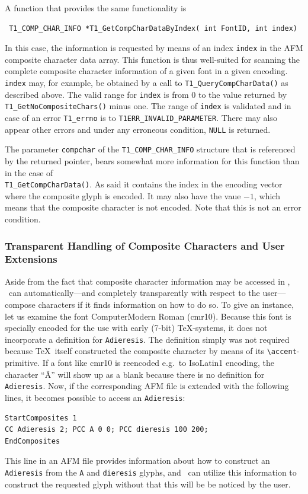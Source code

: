 A function that provides the same functionality is
\precorr
\begin{verbatim}
 T1_COMP_CHAR_INFO *T1_GetCompCharDataByIndex( int FontID, int index)
\end{verbatim}\postcorr
In this case, the information is requested by means of an index \verb+index+
in the AFM composite character data array. This function is thus well-suited
for scanning the complete composite character information of a given font in a
given encoding. \verb+index+ may, for example, be obtained by a call to
\verb+T1_QueryCompCharData()+ as described above. The valid range for
\verb+index+ is from $0$ to the value returned by
\verb+T1_GetNoCompositeChars()+ minus one. The range of \verb+index+ is
validated and in case of an error \verb+T1_errno+ is to
\verb+T1ERR_INVALID_PARAMETER+. There may also appear other errors and under any
erroneous condition, \verb+NULL+ is returned.

The parameter \verb+compchar+ of the \verb+T1_COMP_CHAR_INFO+ structure that
is referenced by the returned pointer, bears somewhat more information for
this function than in the case of \\
\verb+T1_GetCompCharData()+. As said it contains the index in the encoding
vector where the composite glyph is encoded. It may also have the vaue $-1$,
which means that the composite character is not encoded. Note that this is not
an error condition.


\subsubsection{Transparent Handling of Composite Characters and User Extensions}
\label{subsubsec:Transparent Handling of Composite Characters and User
  Extensions}%

Aside from the fact that composite character information may be accessed in
\tonelib, \tonelib\ can automatically---and completely transparently with
respect to the user---compose characters if it finds information on how to do
so.  To give an instance, let us examine the font ComputerModern Roman
(cmr10). Because this font is specially encoded for the use with early (7-bit)
\TeX-systems, it does not incorporate a definition for \verb+Adieresis+. The
definition simply was not required because \TeX\ itself constructed the
composite character by means of its \verb+\accent+-primitive.  If a font like
cmr10 is reencoded e.g.~to IsoLatin1 encoding, the character ``\"A'' will show
up as a blank because there is no definition for \verb+Adieresis+. Now, if the
corresponding AFM file is extended with the following lines, it becomes
possible to access an \verb+Adieresis+:
\begin{verbatim}
StartComposites 1
CC Adieresis 2; PCC A 0 0; PCC dieresis 100 200;
EndComposites
\end{verbatim}
This line in an AFM file provides information about how to construct an
\verb+Adieresis+ from the \verb+A+ and  \verb+dieresis+ glyphs, and \tonelib\
can utilize this information to construct the requested glyph without that
this will be be noticed by the user. 

